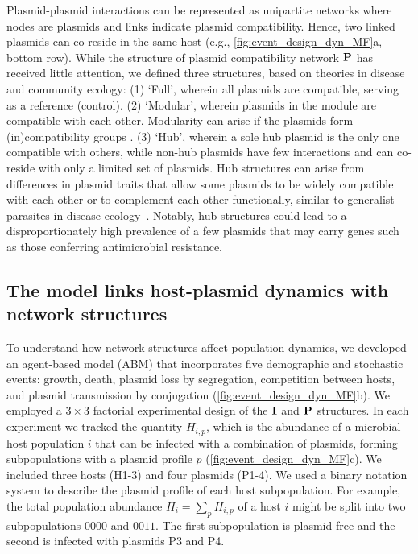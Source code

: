 \documentclass[10pt,letterpaper]{article}
\begin{document}
Plasmid-plasmid interactions can be represented as unipartite networks where nodes are plasmids and links indicate plasmid compatibility. Hence, two linked plasmids can co-reside in the same host (e.g., \cref{fig:event_design_dyn_MF}a, bottom row). While the structure of plasmid compatibility network $\vb{P}$ has received little attention, we defined three structures, based on theories in disease and community ecology: (1) `Full', wherein all plasmids are compatible, serving as a reference (control). (2) `Modular', wherein plasmids in the module are compatible with each other. Modularity can arise if the plasmids form (in)compatibility groups \cite{Dionisio2019-mh, Helinski2022-na}. (3) `Hub', wherein a sole hub plasmid is the only one compatible with others, while non-hub plasmids have few interactions and can co-reside with only a limited set of plasmids. Hub structures can arise from differences in plasmid traits that allow some plasmids to be widely compatible with each other or to complement each other functionally, similar to generalist parasites in disease ecology~\cite{Light2005-es, Liu2022-mq, Rawstern2023-ua, Yang2020-cf}. Notably, hub structures could lead to a disproportionately high prevalence of a few plasmids that may carry genes such as those conferring antimicrobial resistance.

\subsection*{The model links host-plasmid dynamics with network structures} 
To understand how network structures affect population dynamics, we developed an agent-based model (ABM) that incorporates five demographic and stochastic events: growth, death, plasmid loss by segregation, competition between hosts, and plasmid transmission by conjugation (\cref{fig:event_design_dyn_MF}b). We employed a $3 \times 3$ factorial experimental design of the $\vb{I}$ and $\vb{P}$ structures. In each experiment we tracked the quantity $H_{i,p}$, which is the abundance of a microbial host population $i$ that can be infected with a combination of plasmids, forming subpopulations with a plasmid profile $p$ (\cref{fig:event_design_dyn_MF}c). We included three hosts (H1-3) and four plasmids (P1-4). We used a binary notation system to describe the plasmid profile of each host subpopulation. For example, the total population abundance $H_i = \sum_p H_{i,p}$ of a host $i$ might be split into two subpopulations $0000$ and $0011$. The first subpopulation is plasmid-free and the second is infected with plasmids P3 and P4. 
\end{document}
